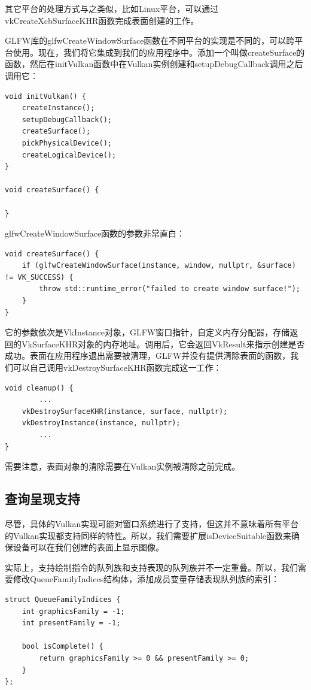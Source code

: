 \documentclass{ctexart}
\begin{document}
其它平台的处理方式与之类似，比如Linux平台，可以通过vkCreateXcbSurfaceKHR函数完成表面创建的工作。

GLFW库的glfwCreateWindowSurface函数在不同平台的实现是不同的，可以跨平台使用。现在，我们将它集成到我们的应用程序中。添加一个叫做createSurface的函数，然后在initVulkan函数中在Vulkan实例创建和setupDebugCallback调用之后调用它：

\begin{lstlisting}[language={[ANSI]C}]
void initVulkan() {
	createInstance();
	setupDebugCallback();
	createSurface();
	pickPhysicalDevice();
	createLogicalDevice();
}

void createSurface() {

}
\end{lstlisting}

glfwCreateWindowSurface函数的参数非常直白：

\begin{lstlisting}[language={[ANSI]C}]
void createSurface() {
	if (glfwCreateWindowSurface(instance, window, nullptr, &surface) != VK_SUCCESS) {
		throw std::runtime_error("failed to create window surface!");
	}
}
\end{lstlisting}

它的参数依次是VkInstance对象，GLFW窗口指针，自定义内存分配器，存储返回的VkSurfaceKHR对象的内存地址。调用后，它会返回VkResult来指示创建是否成功。表面在应用程序退出需要被清理，GLFW并没有提供清除表面的函数，我们可以自己调用vkDestroySurfaceKHR函数完成这一工作：

\begin{lstlisting}[language={[ANSI]C}]
void cleanup() {
		...
	vkDestroySurfaceKHR(instance, surface, nullptr);
	vkDestroyInstance(instance, nullptr);
		...
}
\end{lstlisting}

需要注意，表面对象的清除需要在Vulkan实例被清除之前完成。

\subsection{查询呈现支持}

尽管，具体的Vulkan实现可能对窗口系统进行了支持，但这并不意味着所有平台的Vulkan实现都支持同样的特性。所以，我们需要扩展isDeviceSuitable函数来确保设备可以在我们创建的表面上显示图像。

实际上，支持绘制指令的队列族和支持表现的队列族并不一定重叠。所以，我们需要修改QueueFamilyIndices结构体，添加成员变量存储表现队列族的索引：

\begin{lstlisting}[language={[ANSI]C}]
struct QueueFamilyIndices {
	int graphicsFamily = -1;
	int presentFamily = -1;

	bool isComplete() {
		return graphicsFamily >= 0 && presentFamily >= 0;
	}
};
\end{lstlisting}
\end{document}

